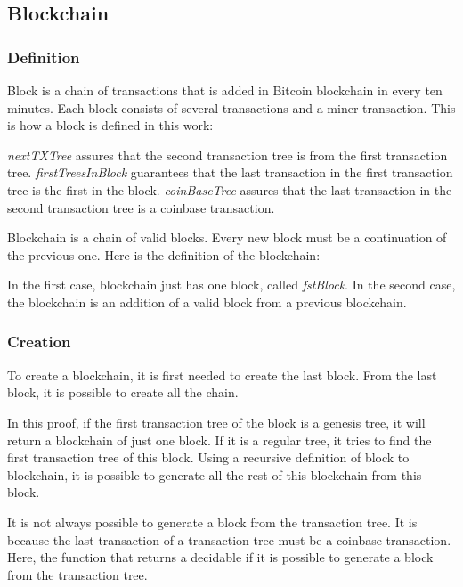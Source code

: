 \subsection{Blockchain}

\subsubsection{Definition}

Block is a chain of transactions that is added in Bitcoin blockchain in every ten minutes.
Each block consists of several transactions and a miner transaction.
This is how a block is defined in this work:


\emph{nextTXTree} assures that the second transaction tree is from the first transaction tree.
\emph{firstTreesInBlock} guarantees that the last transaction in the first transaction tree
is the first in the block.
\emph{coinBaseTree} assures that the last transaction in the second transaction tree is
a coinbase transaction.

Blockchain is a chain of valid blocks.
Every new block must be a continuation of the previous one.
Here is the definition of the blockchain:


In the first case, blockchain just has one block, called \emph{fstBlock}.
In the second case, the blockchain is an addition of a valid block from a previous blockchain.

\subsubsection{Creation}

To create a blockchain, it is first needed to create the last block.
From the last block, it is possible to create all the chain.


In this proof, if the first transaction tree of the block is a genesis tree,
it will return a blockchain of just one block.
If it is a regular tree, it tries to find the first transaction tree of this block.
Using a recursive definition of block to blockchain,
it is possible to generate all the rest of this blockchain from this block.

It is not always possible to generate a block from the transaction tree.
It is because the last transaction of a transaction tree must be a coinbase transaction.
Here, the function that returns a decidable if it is possible to generate a block from
the transaction tree.

